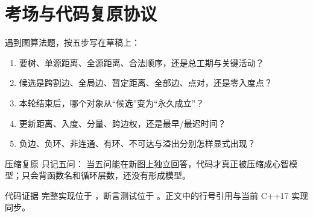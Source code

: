 \documentclass[UTF8,fontset=none,11pt,a4paper]{ctexart}
\begin{document}
\section{考场与代码复原协议}

遇到图算法题，按五步写在草稿上：
\begin{enumerate}
  \item {}要树、单源距离、全源距离、合法顺序，还是总工期与关键活动？
  \item {}候选是跨割边、全局边、暂定距离、全部边、点对，还是零入度点？
  \item {}本轮结束后，哪个对象从“候选”变为“永久成立”？
  \item {}更新距离、入度、分量、跨边权，还是最早/最迟时间？
  \item {}负边、负环、非连通、有环、不可达与溢出分别怎样显式出现？
\end{enumerate}

\begin{corebox}{压缩复原}
只记五问：
当五问能在新图上独立回答，代码才真正被压缩成心智模型；只会背函数名和循环层数，还没有形成模型。
\end{corebox}

\begin{methodbox}{代码证据}
完整实现位于 ，断言测试位于
。正文中的行号引用与当前 C++17 实现同步。
\end{methodbox}
\end{document}
